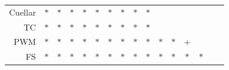 \documentclass[11pt]{article}
\begin{document}
\begin{table}[h!]
\begin{center}
\begin{tabular}{ rccccccccccccccc }
    Cuellar & $*$ & $*$ & $*$ & $*$ & $*$ & $*$ & $*$ & $*$ & $*$ &     &     &     &     &     &     \\
    TC & $*$ & $*$ & $*$ & $*$ & $*$ & $*$ & $*$ & $*$ & $*$ &     &     &     &     &     &     \\
    PWM & $*$ & $*$ & $*$ & $*$ & $*$ & $*$ & $*$ & $*$ & $*$ & $*$ & $*$ & $+$ &     &     &     \\
    FS & $*$ & $*$ & $*$ & $*$ & $*$ & $*$ & $*$ & $*$ & $*$ & $*$ & $*$ & $*$ & $*$ &     &     \\
    \hline
  \end{tabular}
\end{center}
\vspace{0.0cm}
\end{table}

\clearpage
\end{document}
